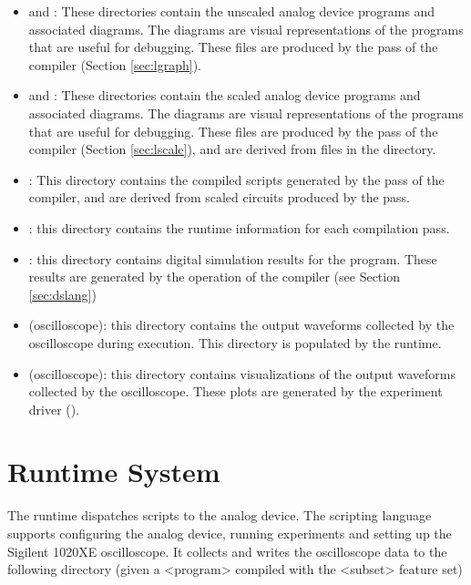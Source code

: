 \begin{itemize}
\item{} and : These directories contain the
  unscaled analog device programs and associated diagrams. The diagrams are visual
  representations of the programs that are useful for debugging. These files are
  produced by the  pass of the \legno compiler (Section \ref{sec:lgraph}).
\item{} and : These directories contain the
  scaled analog device programs and associated diagrams. The diagrams are visual
  representations of the programs that are useful for debugging. These files are
  produced by the  pass of the \legno compiler (Section \ref{sec:lscale}), and are derived from
  files in the  directory.
\item {}: This directory contains the compiled  scripts
  generated by the \srcgen pass of the \legno compiler, and are derived from
  scaled circuits produced by the  pass.
\item{}: this directory contains the runtime information for each
  compilation pass.
\item{}: this directory contains digital simulation results for the
  program. These results are generated by the  operation of the
  \legno compiler (see Section \ref{sec:dslang})
\item{} (oscilloscope): this directory contains the output waveforms
    collected by the oscilloscope during execution. This directory is populated by the
    \grendel runtime.
\item{} (oscilloscope): this directory contains visualizations of the output
  waveforms collected by the oscilloscope. These plots are generated by the
  experiment driver ().
\end{itemize}

\section{Runtime System}

The \grendel runtime dispatches  scripts to the analog device. The
\grendel scripting language supports configuring the analog device, running
experiments and setting up the Sigilent 1020XE oscilloscope. It collects and writes the
oscilloscope data to the following directory (given a <program> compiled with
the <subset> feature set)

